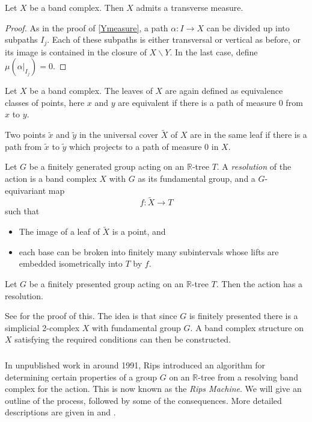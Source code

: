 \begin{lemma}
    Let $X$ be a band complex. Then $X$ admits a transverse measure. 
\end{lemma}
\begin{proof}
    As in the proof of \ref{Ymeasure}, a path $\alpha:I\rightarrow X$ can be divided up into subpaths $I_j$. Each of these subpaths is either transversal or vertical as before, or its image is contained in the closure of $X\backslash Y$. In the last case, define $\mu(\alpha\vert_{I_j})=0$.
\end{proof}

Let $X$ be a band complex. The leaves of $X$ are again defined as equivalence classes of points, here $x$ and $y$ are equivalent if there is a path of measure 0 from $x$ to $y$. 

Two points $\tilde{x}$ and $\tilde{y}$ in the universal cover $\tilde{X}$ of $X$ are in the same leaf if there is a path from $\tilde{x}$ to $\tilde{y}$ which projects to a path of measure 0 in $X$. 

\begin{definition}
    Let $G$ be a finitely generated group acting on an $\mathbb{R}$-tree $T$. A \emph{resolution} of the action is a band complex $X$ with $G$ as its fundamental group, and a $G$-equivariant map \[f:\tilde{X}\rightarrow T\] such that 
    \begin{itemize}
        \item The image of a leaf of $\tilde{X}$ is a point, and
        \item each base can be broken into finitely many subintervals whose lifts are embedded isometrically into $T$ by $f$.
    \end{itemize}
\end{definition}


\begin{theorem}
    Let $G$ be a finitely presented group acting on an $\mathbb{R}$-tree $T$. Then the action has a resolution.
\end{theorem}
See \cite{Wilton} for the proof of this. The idea is that since $G$ is finitely presented there is a simplicial 2-complex $X$ with fundamental group $G$. A band complex structure on $X$ satisfying the required conditions can then be constructed.

\subsubsection{} In unpublished work in around 1991, Rips introduced an algorithm for determining certain properties of a group $G$ on an $\mathbb{R}$-tree from a resolving band complex for the action. This is now known as the \textit{Rips Machine}. We will give an outline of the process, followed by some of the consequences. More detailed descriptions are given in \cite{Wilton} and \cite{Bestvina_trees}.

